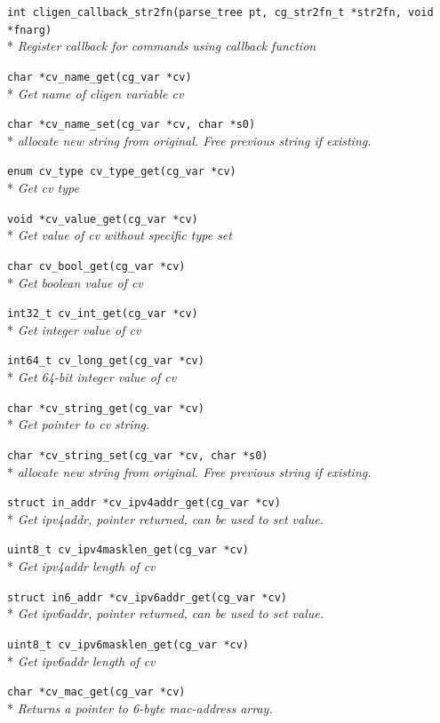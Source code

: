 \documentclass[a4paper, 10pt] {article}
\begin{document}
{{\tt int cligen\_callback\_str2fn(parse\_tree pt, cg\_str2fn\_t *str2fn, void *fnarg)}\\*
\emph{  Register callback for commands using callback function}

{\tt char *cv\_name\_get(cg\_var *cv)}\\*
\emph{ Get name of cligen variable cv}

{\tt char *cv\_name\_set(cg\_var *cv, char *s0)}\\*
\emph{ allocate new string from original. Free previous string if existing.}

{\tt enum cv\_type cv\_type\_get(cg\_var *cv)}\\*
\emph{ Get cv type}

{\tt void *cv\_value\_get(cg\_var *cv)}\\*
\emph{ Get value of cv without specific type set}

{\tt char cv\_bool\_get(cg\_var *cv)}\\*
\emph{ Get boolean value of cv}

{\tt int32\_t cv\_int\_get(cg\_var *cv)}\\*
\emph{ Get integer value of cv}

{\tt int64\_t cv\_long\_get(cg\_var *cv)}\\*
\emph{ Get 64-bit integer value of cv}

{\tt char *cv\_string\_get(cg\_var *cv)}\\*
\emph{ Get pointer to cv string. }

{\tt char *cv\_string\_set(cg\_var *cv, char *s0)}\\*
\emph{ allocate new string from original. Free previous string if existing.}

{\tt struct in\_addr *cv\_ipv4addr\_get(cg\_var *cv)}\\*
\emph{ Get ipv4addr, pointer returned, can be used to set value.}

{\tt uint8\_t cv\_ipv4masklen\_get(cg\_var *cv)}\\*
\emph{ Get ipv4addr length of cv}

{\tt struct in6\_addr *cv\_ipv6addr\_get(cg\_var *cv)}\\*
\emph{ Get ipv6addr, pointer returned, can be used to set value.}

{\tt uint8\_t cv\_ipv6masklen\_get(cg\_var *cv)}\\*
\emph{ Get ipv6addr length of cv}

{\tt char *cv\_mac\_get(cg\_var *cv)}\\*
\emph{  Returns a pointer to 6-byte mac-address array. }

}
\end{document}
